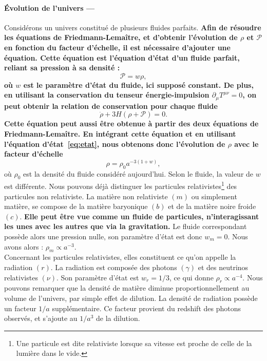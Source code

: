 \documentclass[11pt, twoside, a4paper, openright]{report}
\begin{document}
\paragraph{Évolution de l'univers —}
Considérons un univers constitué de plusieurs fluides parfaits.
\textbf{Afin de résoudre les équations de Friedmann-Lemaître, et d'obtenir l'évolution de $\rho$ et $\mathcal{P}$ en fonction du facteur d'échelle, il est nécessaire d'ajouter une équation. Cette équation est l'équation d'état d'un fluide parfait, reliant sa pression à sa densité :
\begin{equation}
  \label{eq:etat}
  \mathcal{P} = w \rho,
\end{equation}
où $w$ est le paramètre d'état du fluide, ici supposé constant.
De plus, en utilisant la conservation du tenseur énergie-impulsion $\partial_{\mu} T^{\mu \nu} = 0$, on peut obtenir la relation de conservation pour chaque fluide
\begin{equation}
  \label{eq:conservation}
  \dot{\rho} + 3 H (\rho + \mathcal{P}) = 0 .
\end{equation}
Cette équation peut aussi être obtenue à partir des deux équations de Friedmann-Lemaître. En intégrant cette équation et en utilisant l'équation d'état~\ref{eq:etat}, nous obtenons donc l'évolution de $\rho$ avec le facteur d'échelle}
\begin{equation}
  \label{eq:rho_vs_a}
  \rho = \rho_0 a^{-3(1+w)} ,
\end{equation}
où $\rho_0$ est la densité du fluide considéré aujourd'hui.
Selon le fluide, la valeur de $w$ est différente. Nous pouvons déjà distinguer les particules relativistes\footnote{Une particule est dite relativiste lorsque sa vitesse est proche de celle de la lumière dans le vide.} des particules non relativiste. La matière non relativiste $(m)$ ou simplement matière, se compose de la matière baryonique $(b)$ et de la matière noire froide $(c)$.
\textbf{Elle peut être vue comme un fluide de particules, n'interagissant les unes avec les autres que via la gravitation.} Le fluide correspondant possède alors une pression nulle, son paramètre d'état est donc $w_m = 0$. Nous avons alors : $\rho_m \propto a^{-3}$. \\
Concernant les particules relativistes, elles constituent ce qu'on appelle la radiation $(r)$. La radiation est composée  des photons $(\gamma)$ et des neutrinos relativistes $(\nu)$. Son paramètre d'état est $w_r = 1/3$, ce qui donne $\rho_r \propto a^{-4}$. Nous pouvons remarquer que la densité de matière diminue proportionnellement au volume de l'univers, par simple effet de dilution. La densité de radiation possède un facteur $1/a$ supplémentaire. Ce facteur provient du redshift des photons observés, et s'ajoute au $1/a^3$ de la dilution.
\end{document}
